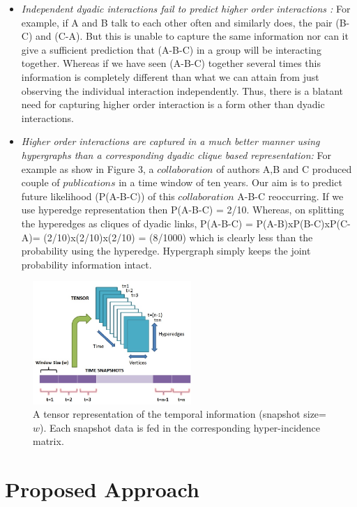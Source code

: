 \documentclass{sig-alternate}
\begin{document}
\begin{itemize}

\item \textit{Independent dyadic interactions fail to predict higher order interactions :} For example, if A and B talk to each other often and similarly does, the pair (B-C) and (C-A). But this is unable to capture the same information nor can it give a sufficient prediction that (A-B-C) in a group will be interacting together. Whereas if we have seen (A-B-C) together several times this information is completely different than what we can attain from just observing the individual interaction independently. Thus, there is a blatant need for capturing higher order interaction is a form other than dyadic interactions. 

\item \textit{Higher order interactions are captured in a much better manner using hypergraphs than a corresponding dyadic clique based representation:} For example as show in Figure 3, a $collaboration$ of authors A,B and C produced couple of $publications$ in a time window of ten years. Our aim is to predict future likelihood (P(A-B-C)) of this $collaboration$ A-B-C reoccurring. If we use hyperedge representation then P(A-B-C) = 2/10. Whereas, on splitting the hyperedges as cliques of dyadic links, P(A-B-C) = P(A-B)xP(B-C)xP(C-A)= (2/10)x(2/10)x(2/10) = (8/1000) which is clearly less than the probability using the hyperedge. Hypergraph simply keeps the joint probability information intact.
\end{itemize}

\begin{figure}[h!]
\centering
\includegraphics[width=60mm]{time_snap.jpg}
\caption{A tensor representation of the temporal information (snapshot size=$w$). Each snapshot data is fed in the corresponding hyper-incidence matrix.}
\label{overflow}
\vspace{-1.7em}
\end{figure}

\section{Proposed Approach}
\end{document}
